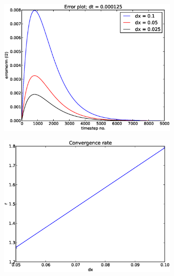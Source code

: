 \begin{figure}[H]
 \centering
 \begin{subfigure}[b]{0.48\textwidth}
  \includegraphics[width=\textwidth]{../doc/results/experiment_14042014_1303_convergence_tests_etc/results/errorplot.eps}
  \caption{}
 \end{subfigure}
 \begin{subfigure}[b]{0.48\textwidth}
  \includegraphics[width=\textwidth]{../doc/results/experiment_14042014_1303_convergence_tests_etc/results/ConvergenceTest.eps}
  \caption{}
 \end{subfigure}
 \caption[]{}
 \label{spatial_convergence_test}
\end{figure}


